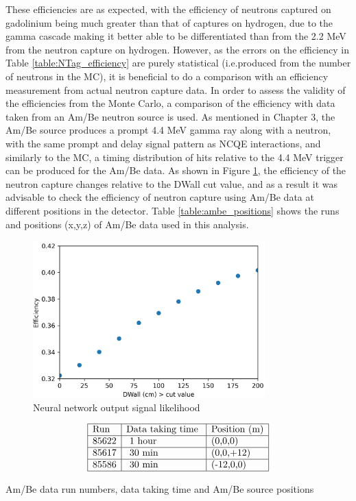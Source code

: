 These efficiencies are as expected, with the efficiency of neutrons captured on gadolinium being much greater than that of captures on hydrogen, due to the gamma cascade making it better able to be differentiated than from the 2.2 MeV from the neutron capture on hydrogen. However, as the errors on the efficiency in Table \ref{table:NTag_efficiency} are purely statistical (i.e.produced from the number of neutrons in the MC), it is beneficial to do a comparison with an efficiency measurement from actual neutron capture data. In order to assess the validity of the efficiencies from the Monte Carlo, a comparison of the efficiency with data taken from an Am/Be neutron source is used. As mentioned in Chapter 3, the Am/Be source produces a prompt 4.4 MeV gamma ray along with a neutron, with the same prompt and delay signal pattern as NCQE interactions, and similarly to the MC, a timing distribution of hits relative to the 4.4 MeV trigger can be produced for the Am/Be data. As shown in Figure \ref{fig:efficiency_dwall}, the efficiency of the neutron capture changes relative to the DWall cut value, and as a result it was advisable to check the efficiency of neutron capture using Am/Be data at different positions in the detector. Table \ref{table:ambe_positions} shows the runs and positions (x,y,z) of Am/Be data used in this analysis.

\begin{figure}
    \centering
    \includegraphics[width=0.8\textwidth]{Figures/efficiency_dwall.png}
    \caption{Neural network output signal likelihood }
    \label{fig:efficiency_dwall}

\end{figure}


\begin{table}
    $$
    \begin{array}{|l|l|l|l|l|}
    \hline \text{Run} & \text {Data taking time } & \text{Position (m)} \\
    \hline 85622 & \text { 1 hour} & \text{(0,0,0)} \\
    \hline 85617 & \text { 30 min} & \text{(0,0,+12)} \\
    \hline 85586 & \text { 30 min} & \text{(-12,0,0)} \\
    \hline
    \end{array}
    $$
    \caption{Am/Be data run numbers, data taking time and Am/Be source positions}
    \label{table:ambe_positions}
\end{table}

